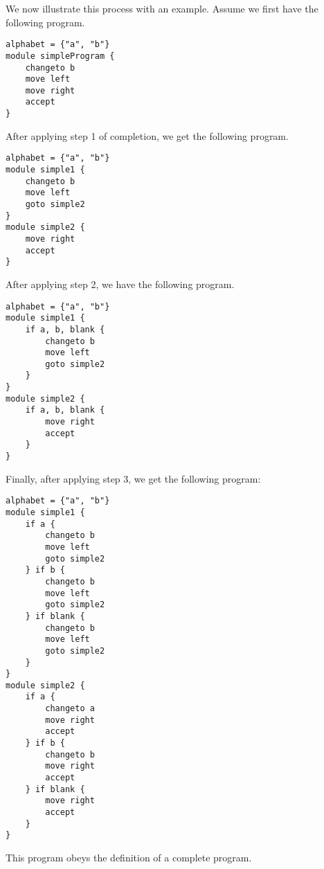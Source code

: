 \begin{appendices}
We now illustrate this process with an example. Assume we first have the following program.
\begin{lstlisting}[language=TML]
alphabet = {"a", "b"}
module simpleProgram {
    changeto b
    move left
    move right
    accept
}
\end{lstlisting}
After applying step 1 of completion, we get the following program.
\begin{lstlisting}[language=TML]
alphabet = {"a", "b"}
module simple1 {
    changeto b
    move left
    goto simple2
}
module simple2 {
    move right
    accept
}
\end{lstlisting}
After applying step 2, we have the following program.
\begin{lstlisting}[language=TML]
alphabet = {"a", "b"}
module simple1 {
    if a, b, blank {
        changeto b
        move left
        goto simple2
    }
}
module simple2 {
    if a, b, blank {
        move right
        accept
    }
}
\end{lstlisting}
Finally, after applying step 3, we get the following program:
\begin{lstlisting}[language=TML]
alphabet = {"a", "b"}
module simple1 {
    if a {
        changeto b
        move left
        goto simple2
    } if b {
        changeto b
        move left
        goto simple2
    } if blank {
        changeto b
        move left
        goto simple2
    }
}
module simple2 {
    if a {
        changeto a
        move right
        accept
    } if b {
        changeto b
        move right
        accept
    } if blank {
        move right
        accept
    }
}
\end{lstlisting}
This program obeys the definition of a complete program.


\end{appendices}
